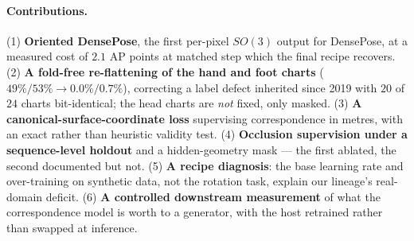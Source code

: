 \paragraph{Contributions.}
(1) \textbf{Oriented DensePose}, the first per-pixel $SO(3)$ output for DensePose, at a measured
cost of $2.1$ AP points at matched step which the final recipe recovers. (2) \textbf{A fold-free
re-flattening of the hand and foot charts} ($49\%/53\%\!\rightarrow\!0.0\%/0.7\%$), correcting a
label defect inherited since 2019 with $20$ of $24$ charts bit-identical; the head charts are
\emph{not} fixed, only masked. (3) \textbf{A canonical-surface-coordinate loss} supervising
correspondence in metres, with an exact rather than heuristic validity test. (4) \textbf{Occlusion
supervision under a sequence-level holdout} and a hidden-geometry mask --- the first ablated, the
second documented but not. (5) \textbf{A recipe diagnosis}: the base learning rate and
over-training on synthetic data, not the rotation task, explain our lineage's real-domain deficit.
(6) \textbf{A controlled downstream measurement} of what the correspondence model is worth to a
generator, with the host retrained rather than swapped at inference.
